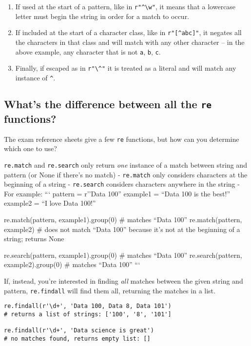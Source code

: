\documentclass[
  letterpaper,
  DIV=11,
  numbers=noendperiod]{scrreprt}
\providecommand{\tightlist}{%
  \setlength{\itemsep}{0pt}\setlength{\parskip}{0pt}}\usepackage{longtable,booktabs,array}
\begin{document}
\begin{enumerate}
\def\labelenumi{\arabic{enumi}.}
\tightlist
\item
  If used at the start of a pattern, like in
  \texttt{r"\^{}\textbackslash{}w"}, it means that a lowercase letter
  must begin the string in order for a match to occur.
\item
  If included at the start of a character class, like in
  \texttt{r"{[}\^{}abc{]}"}, it negates all the characters in that class
  and will match with any other character -- in the above example, any
  character that is not \texttt{a}, \texttt{b}, \texttt{c}.
\item
  Finally, if escaped as in \texttt{r"\textbackslash{}\^{}"} it is
  treated as a literal and will match any instance of \texttt{\^{}}.
\end{enumerate}

\subsection{\texorpdfstring{What's the difference between all the
\texttt{re}
functions?}{What's the difference between all the re functions?}}\label{whats-the-difference-between-all-the-re-functions}

The exam reference sheets give a few \texttt{re} functions, but how can
you determine which one to use?

\texttt{re.match} and \texttt{re.search} only return \emph{one} instance
of a match between string and pattern (or None if there's no match) -
\texttt{re.match} only considers characters at the beginning of a string
- \texttt{re.search} considers characters anywhere in the string - For
example: ``` pattern = r''Data 100'' example1 = ``Data 100 is the
best!'' example2 = ``I love Data 100!''

re.match(pattern, example1).group(0) \# matches ``Data 100''
re.match(pattern, example2) \# does not match ``Data 100'' because it's
not at the beginning of a string; returns None

re.search(pattern, example1).group(0) \# matches ``Data 100''
re.search(pattern, example2).group(0) \# matches ``Data 100'' ```

If, instead, you're interested in finding \emph{all} matches between the
given string and pattern, \texttt{re.findall} will find them all,
returning the matches in a list.

\begin{verbatim}
re.findall(r'\d+', 'Data 100, Data 8, Data 101') 
# returns a list of strings: ['100', '8', '101']

re.findall(r'\d+', 'Data science is great')  
# no matches found, returns empty list: []
\end{verbatim}
\end{document}
